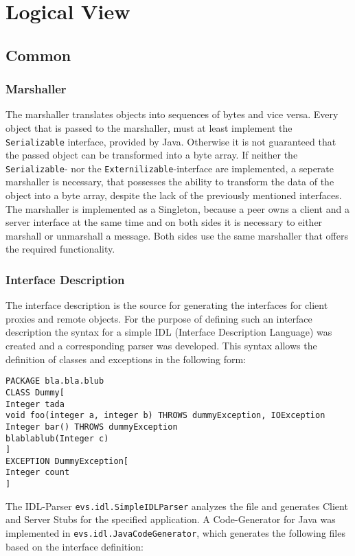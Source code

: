 \section{Logical View}

\subsection{Common}
\subsubsection{Marshaller}
The marshaller translates objects into sequences of bytes and vice versa. Every object that is passed to the marshaller, must at least implement the \texttt{Serializable} interface, provided by Java. Otherwise it is not guaranteed that the passed object can be transformed into a byte array. If neither the \texttt{Serializable}- nor the \texttt{Externilizable}-interface are implemented, a seperate marshaller is necessary, that possesses the ability to transform the data of the object into a byte array, despite the lack of the previously mentioned interfaces. The marshaller is implemented as a Singleton, because a peer owns a client and a server interface at the same time and on both sides it is necessary to either marshall or unmarshall a message. Both sides use the same marshaller that offers the required functionality.

\subsubsection{Interface Description}
The interface description is the source for generating the interfaces for client proxies and remote objects. For the purpose of defining such an interface description the syntax for a simple IDL (Interface Description Language) was created and a corresponding parser was developed. This syntax allows the definition of classes and exceptions in the following form:

\begin{code}
\begin{verbatim}
PACKAGE bla.bla.blub
CLASS Dummy[
Integer tada
void foo(integer a, integer b) THROWS dummyException, IOException
Integer bar() THROWS dummyException
blablablub(Integer c)
]
EXCEPTION DummyException[
Integer count
]
\end{verbatim}
\end{code}

The IDL-Parser \texttt{evs.idl.SimpleIDLParser} analyzes the file and generates Client and Server Stubs for the specified application. A Code-Generator for Java was implemented in \texttt{evs.idl.JavaCodeGenerator}, which generates the following files based on the interface definition:

